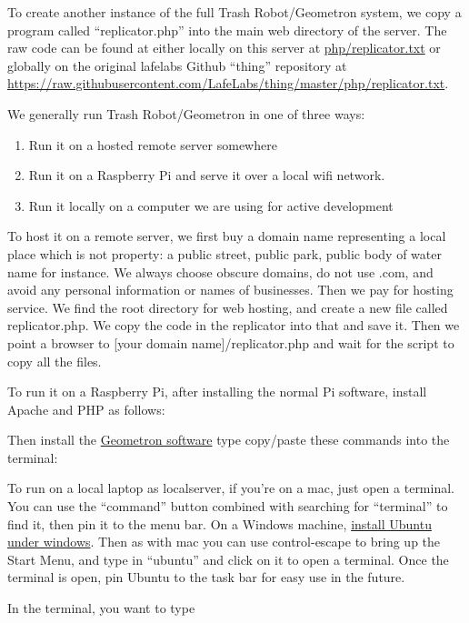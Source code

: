 To create another instance of the full Trash Robot/Geometron system, we
copy a program called ``replicator.php'' into the main web directory of
the server. The raw code can be found at either locally on this server
at \url{php/replicator.txt} or globally on the original lafelabs Github
``thing'' repository at
\url{https://raw.githubusercontent.com/LafeLabs/thing/master/php/replicator.txt}.

We generally run Trash Robot/Geometron in one of three ways:

\begin{enumerate}
\def\labelenumi{\arabic{enumi}.}
\tightlist
\item
  Run it on a hosted remote server somewhere
\item
  Run it on a Raspberry Pi and serve it over a local wifi network.
\item
  Run it locally on a computer we are using for active development
\end{enumerate}

To host it on a remote server, we first buy a domain name representing a
local place which is not property: a public street, public park, public
body of water name for instance. We always choose obscure domains, do
not use .com, and avoid any personal information or names of businesses.
Then we pay for hosting service. We find the root directory for web
hosting, and create a new file called replicator.php. We copy the code
in the replicator into that and save it. Then we point a browser to
{[}your domain name{]}/replicator.php and wait for the script to copy
all the files.

To run it on a Raspberry Pi, after installing the normal Pi software,
install Apache and PHP as follows:

Then install the \href{https://github.com/lafelabs/thing/}{Geometron
software} type copy/paste these commands into the terminal:

To run on a local laptop as localserver, if you're on a mac, just open a
terminal. You can use the ``command'' button combined with searching for
``terminal'' to find it, then pin it to the menu bar. On a Windows
machine,
\href{https://ubuntu.com/tutorials/ubuntu-on-windows\#1-overview}{install
Ubuntu under windows}. Then as with mac you can use control-escape to
bring up the Start Menu, and type in ``ubuntu'' and click on it to open
a terminal. Once the terminal is open, pin Ubuntu to the task bar for
easy use in the future.

In the terminal, you want to type

